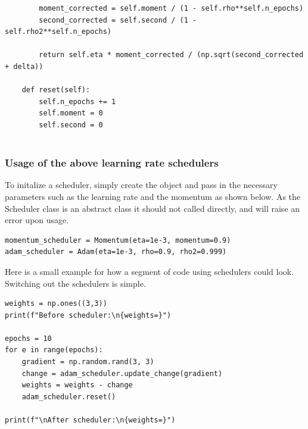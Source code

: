 \documentclass{beamer}
\begin{document}
\begin{frame}
\begin{verbatim}
        moment_corrected = self.moment / (1 - self.rho**self.n_epochs)
        second_corrected = self.second / (1 - self.rho2**self.n_epochs)

        return self.eta * moment_corrected / (np.sqrt(second_corrected + delta))

    def reset(self):
        self.n_epochs += 1
        self.moment = 0
        self.second = 0


\end{verbatim}
\end{frame}

\begin{frame}
\frametitle{Usage of the above learning rate schedulers}

To initalize a scheduler, simply create the object and pass in the
necessary parameters such as the learning rate and the momentum as
shown below. As the Scheduler class is an abstract class it should not
called directly, and will raise an error upon usage.




\begin{verbatim}
momentum_scheduler = Momentum(eta=1e-3, momentum=0.9)
adam_scheduler = Adam(eta=1e-3, rho=0.9, rho2=0.999)

\end{verbatim}


Here is a small example for how a segment of code using schedulers
could look. Switching out the schedulers is simple.













\begin{verbatim}
weights = np.ones((3,3))
print(f"Before scheduler:\n{weights=}")

epochs = 10
for e in range(epochs):
    gradient = np.random.rand(3, 3)
    change = adam_scheduler.update_change(gradient)
    weights = weights - change
    adam_scheduler.reset()

print(f"\nAfter scheduler:\n{weights=}")

\end{verbatim}
\end{frame}
\end{document}
